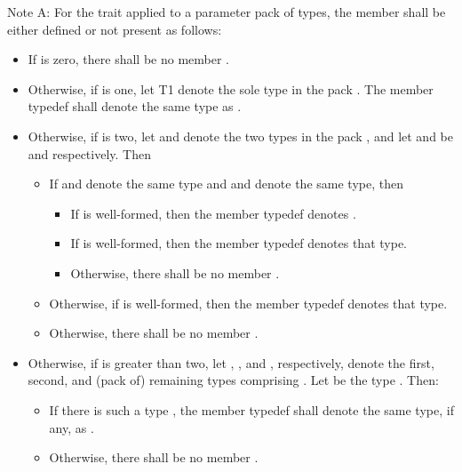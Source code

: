 \pnum
Note A: For the  trait applied to a parameter pack
 of types, the member  shall be either defined or not
present as follows:
\begin{itemize}
\item If  is zero, there shall be no member .
\item Otherwise, if  is one, let T1
  denote the sole type in the pack . The member typedef 
  shall denote the same type as .
\item Otherwise, if  is two, let  and 
  denote the two types in the pack , and let  and 
  be  and  respectively. Then
\begin{itemize}
\item If  and  denote the same type and  and
   denote the same type, then
\begin{itemize}
\item If  is well-formed, then the member typedef
   denotes .
\item If  is well-formed, then the member typedef
   denotes that type.
\item Otherwise, there shall be no member .
\end{itemize}
\item Otherwise, if  is well-formed, then the
  member typedef  denotes that type.
\item Otherwise, there shall be no member .
\end{itemize}
\item Otherwise, if  is greater than two,
  let , , and ,
  respectively, denote the first, second, and (pack of) remaining types
  comprising . Let  be the type
  . Then:
\begin{itemize}
\item If there is such a type , the member typedef
   shall denote the same type, if any, as
  .
\item Otherwise, there shall be no member .
\end{itemize}
\end{itemize}

